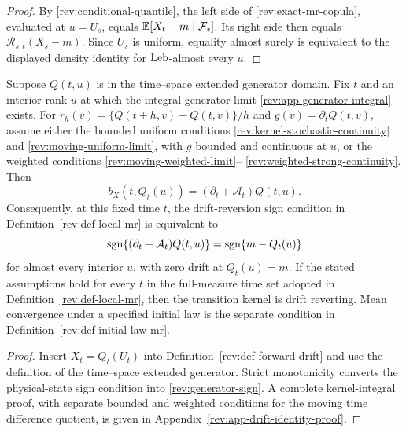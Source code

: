\begin{proof}
By \eqref{rev:conditional-quantile}, the left side of
\eqref{rev:exact-mr-copula}, evaluated at $u=U_s$, equals
$\mathbb E[X_t-m\mid\mathcal F_s]$.  Its right side then equals
$\mathcal R_{s,t}(X_s-m)$.  Since $U_s$ is uniform, equality almost surely is
equivalent to the displayed density identity for $\operatorname{Leb}$-almost every $u$.
\end{proof}

\begin{proposition}
\label{rev:prop-generator-sign}
Suppose $Q(t,u)$ is in the time--space extended generator domain.  Fix $t$ and
an interior rank $u$ at which the integral generator limit
\eqref{rev:app-generator-integral} exists.  For
$r_h(v)=\{Q(t+h,v)-Q(t,v)\}/h$ and
$g(v)=\partial_tQ(t,v)$, assume either the bounded uniform conditions
\eqref{rev:kernel-stochastic-continuity} and
\eqref{rev:moving-uniform-limit}, with $g$ bounded and continuous at $u$, or
the weighted conditions \eqref{rev:moving-weighted-limit}--
\eqref{rev:weighted-strong-continuity}.  Then
\begin{equation}
b_X(t,Q_t(u))=(\partial_t+\mathcal A_t)Q(t,u).
\label{rev:drift-quantile-generator}
\end{equation}
Consequently, at this fixed time $t$, the drift-reversion sign condition in
Definition~\ref{rev:def-local-mr} is equivalent to
\begin{equation}
\operatorname{sgn}\{(\partial_t+\mathcal A_t)Q(t,u)\}
=\operatorname{sgn}\{m-Q_t(u)\}
\label{rev:generator-sign}
\end{equation}
for almost every interior $u$, with zero drift at $Q_t(u)=m$.  If the stated
assumptions hold for every $t$ in the full-measure time set adopted in
Definition~\ref{rev:def-local-mr}, then the transition kernel is drift
reverting.  Mean convergence under a specified initial law is the separate
condition in Definition~\ref{rev:def-initial-law-mr}.
\end{proposition}

\begin{proof}
Insert $X_t=Q_t(U_t)$ into Definition~\ref{rev:def-forward-drift} and use the
definition of the time--space extended generator.  Strict monotonicity converts
the physical-state sign condition into \eqref{rev:generator-sign}.
A complete kernel-integral proof, with separate bounded and weighted conditions
for the moving time difference quotient, is given in
Appendix~\ref{rev:app-drift-identity-proof}.
\end{proof}

